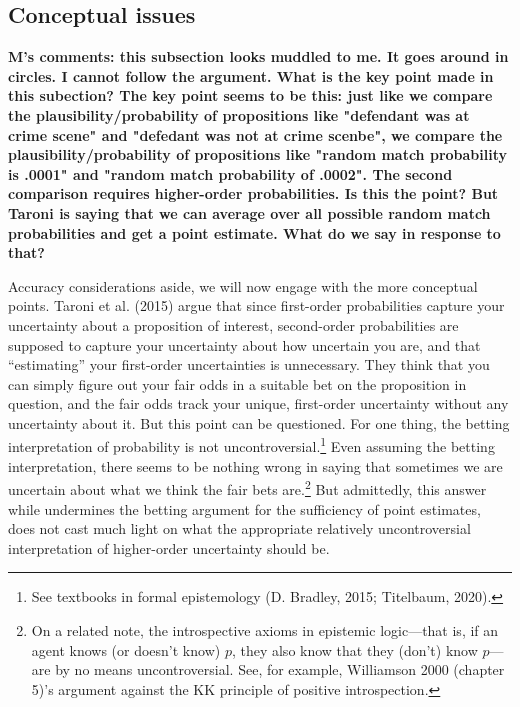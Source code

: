 \documentclass[
  10pt,
  dvipsnames,enabledeprecatedfontcommands]{scrartcl}
\begin{document}
\hypertarget{conceptual-issues}{%
\subsection{Conceptual issues}\label{conceptual-issues}}


\textbf{M's comments: this subsection looks muddled to me. It goes around in circles. I cannot follow the argument. What is the key point made in this subection? The key point seems to be this: just like we compare the plausibility/probability of propositions like "defendant was at crime scene" and "defedant was not at crime scenbe", we compare the plausibility/probability of propositions like "random match probability is .0001" and "random match probability of .0002". The second comparison requires higher-order probabilities. Is this the point? But Taroni is saying that we can average over all possible random match probabilities and get a point estimate. What do we say in response to that?}

Accuracy considerations aside, we will now engage with the more
conceptual points. Taroni et al. (2015) argue that since first-order
probabilities capture your uncertainty about a proposition of interest,
second-order probabilities are supposed to capture your uncertainty
about how uncertain you are, and that ``estimating'' your first-order
uncertainties is unnecessary. They think that you can simply figure out
your fair odds in a suitable bet on the proposition in question, and the
fair odds track your unique, first-order uncertainty without any
uncertainty about it. But this point can be questioned. For one thing,
the betting interpretation of probability is not
uncontroversial.\footnote{See textbooks in formal epistemology (D.
  Bradley, 2015; Titelbaum, 2020).} Even assuming the betting
interpretation, there seems to be nothing wrong in saying that sometimes
we are uncertain about what we think the
fair bets are.\footnote{On a related note, the introspective axioms in
  epistemic logic---that is, if an agent knows (or doesn't know) \(p\),
  they also know that they (don't) know \(p\)---are by no means
  uncontroversial. See, for example, Williamson 2000 (chapter 5)'s
  argument against the KK principle of positive introspection.} But
admittedly, this answer while undermines the betting argument for the
sufficiency of point estimates, does not cast much light on what the
appropriate relatively uncontroversial interpretation of higher-order
uncertainty should be.
\end{document}
